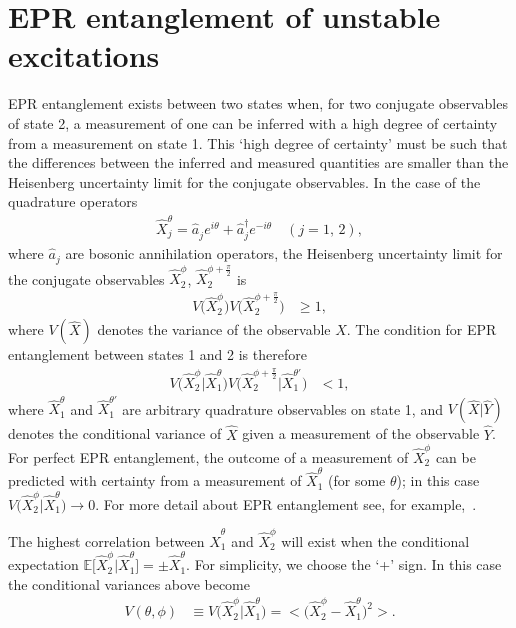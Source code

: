 \section{EPR entanglement of unstable excitations}
\label{FloquetAppendix:EPREntanglement}

EPR entanglement exists between two states when, for two conjugate observables of state 2, a measurement of one can be inferred with a high degree of certainty from a measurement on state 1. This `high degree of certainty' must be such that the differences between the inferred and measured quantities are smaller than the Heisenberg uncertainty limit for the conjugate observables. In the case of the quadrature operators
\begin{align}
    \hat{X}_j^\theta = \hat{a}_j^{\phantom{\dagger}} e^{i \theta} + \hat{a}_j^\dagger e^{-i \theta} \quad (j = 1,\, 2),
\end{align}
where $\hat{a}_j$ are bosonic annihilation operators, the Heisenberg uncertainty limit for the conjugate observables $\hat{X}_2^\phi$, $\hat{X}_2^{\phi + \frac{\pi}{2}}$ is
\begin{align}
    V\big(\hat{X}_2^\phi\big) V\big(\hat{X}_2^{\phi + \frac{\pi}{2}}\big) &\geq 1,
\end{align}
where $V(\hat{X})$ denotes the variance of the observable $\hat{X}$. The condition for EPR entanglement between states 1 and 2 is therefore
\begin{align}
    V\big(\hat{X}_2^\phi \big| \hat{X}_1^\theta\big) V\big(\hat{X}_2^{\phi + \frac{\pi}{2}} \big| \hat{X}_1^{\theta'}\big) &< 1, \label{FloquetAppendix:EPRCondition}
\end{align}
where $\hat{X}_1^\theta$ and $\hat{X}_1^{\theta'}$ are arbitrary quadrature observables on state 1, and $V(\hat{X} | \hat{Y})$ denotes the conditional variance of $\hat{X}$ given a measurement of the observable $\hat{Y}$. For perfect EPR entanglement, the outcome of a measurement of $\hat{X}_2^\phi$ can be predicted with certainty from a measurement of $\hat{X}_1^\theta$ (for some $\theta$); in this case $V\big(\hat{X}_2^\phi \big| \hat{X}_1^\theta\big) \rightarrow 0$. For more detail about EPR entanglement see, for example,~\citep{WallsMilburn}.

The highest correlation between $\hat{X}_1^\theta$ and $\hat{X}_2^\phi$ will exist when the conditional expectation $\mathbb{E}\big[\hat{X}_2^\phi\big| \hat{X}_1^\theta\big] = \pm\hat{X}_1^\theta$. For simplicity, we choose the `+' sign. In this case the conditional variances above become
\begin{align}
    V(\theta, \phi) &\equiv V\big(\hat{X}_2^\phi \big| \hat{X}_1^{\theta}\big) = \big<\big(\hat{X}_2^\phi - \hat{X}_1^\theta\big)^2\big>.
\end{align}

